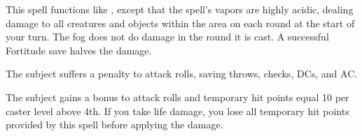 \spellrng{\rngmed}
\spelldur{\durshort}
\begin{spelleffect}
  This spell functions like , except that the spell's vapors are highly acidic, dealing damage to all creatures and objects within the area on each round at the start of your turn. The fog does not do damage in the round it is cast. A successful Fortitude save halves the damage.
\end{spelleffect}

\spellrng{\rngclose}
\begin{spelleffect}
  The subject suffers a  penalty to attack rolls, saving throws, checks, DCs, and AC.
\end{spelleffect}

\spellrng{\rngclose}
\spelldur{\durshort}
\begin{spelleffect}
  The subject gains a  bonus to attack rolls and temporary hit points equal 10  per caster level above 4th. \bonusscalingdescription  If you take life damage, you lose all temporary hit points provided by this spell before applying the damage.
\end{spelleffect}

